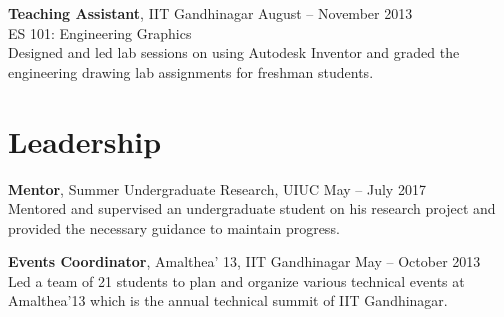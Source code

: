 \documentclass[margin]{res}
\begin{document}
\begin{resume}
{\bf Teaching Assistant}, IIT Gandhinagar \hfill August -- November 2013 \\
ES 101: Engineering Graphics\\
Designed and led lab sessions on using Autodesk Inventor and graded the engineering drawing lab assignments for freshman students.


\section{\large Leadership}
{\bf Mentor}, Summer Undergraduate Research, UIUC \hfill May -- July 2017 \\
Mentored and supervised an undergraduate student on his research project and provided the necessary guidance to maintain progress.

{\bf Events Coordinator}, Amalthea' 13, IIT Gandhinagar \hfill May -- October 2013 \\
Led a team of 21 students to plan and organize various technical events at Amalthea'13 which is the annual technical summit of IIT Gandhinagar.

%
%

\end{resume}
\end{document}
